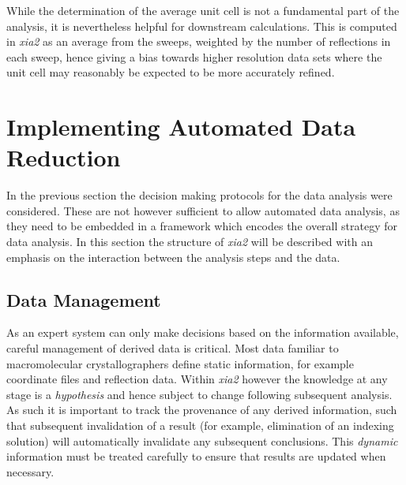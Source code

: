 \documentclass[preprint,pdf]{iucr}
\begin{document}
While the determination of the average unit cell is not a fundamental
part of the analysis, it is nevertheless helpful for downstream
calculations. This is computed in \emph{xia2} as an average from the
sweeps, weighted by the number of reflections in each sweep, hence
giving a bias towards higher resolution data sets where the unit cell
may reasonably be expected to be more accurately refined.

\section{Implementing Automated Data Reduction}

In the previous section the decision making protocols for the data
analysis were considered. These are not however sufficient to allow
automated data analysis, as they need to be embedded in a framework
which encodes the overall strategy for data analysis. In this section
the structure of \emph{xia2} will be described with an emphasis on the
interaction between the analysis steps and the data.

\subsection{Data Management}

As an expert system can only make decisions based on the information
available, careful management of derived data is critical. Most data familiar
to macromolecular crystallographers define static
information, for example coordinate files and reflection data. 
Within \emph{xia2} however
the knowledge at any stage is a \emph{hypothesis} and hence
subject to change following subsequent analysis. As such it is
important to track the provenance of any derived information, such
that subsequent invalidation of a result (for example, elimination of
an indexing solution) will automatically invalidate any subsequent
conclusions. This \emph{dynamic} information must be treated carefully
to ensure that results are updated when necessary. 
\end{document}
